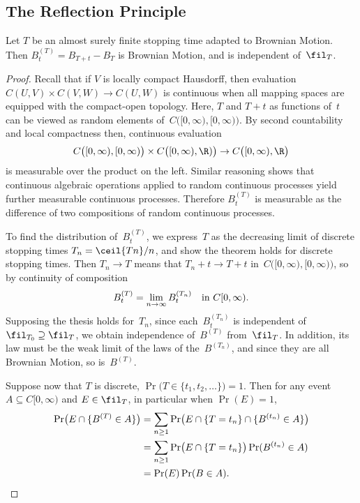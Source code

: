 \subsection	{The Reflection Principle}

\begin	{theorem}
Let $T$ be an almost surely finite stopping time adapted to Brownian Motion.
Then \( B^{(T)}_t = B_{T+t} - B_T \) is Brownian Motion,
and is independent of~$\fil_T$.
\end	{theorem}
\begin	{proof}
Recall that if $V$ is locally compact Hausdorff,
then evaluation \( C(U,V) \times C(V,W) \to C(U,W) \) is continuous
when all mapping spaces are equipped with the compact-open topology.
Here, $T$ and \( T + t \) as functions of~$t$
can be viewed as random elements of~$C\bigl([0,\infty),[0,\infty)\bigr)$.
By second countability and local compactness then,
continuous evaluation \[
	C\bigl([0,\infty),[0,\infty)\bigr) \times
		C\bigl([0,\infty),\R)\bigr)
	\to C\bigl([0,\infty),\R\bigr)
\] is measurable over the product on the left.
Similar reasoning shows that continuous algebraic operations
applied to random continuous processes
yield further measurable continuous processes.
Therefore $B^{(T)}_t$ is measurable as the difference
of two compositions of random continuous processes.

To find the distribution of~$B^{(T)}_t$,
we express~$T$ as the decreasing limit of discrete stopping times
\( T_n = \ceil{Tn}/n \),
and show the theorem holds for discrete stopping times.
Then \( T_n \to T \) means that \( T_n + t \to T + t \)
in~$C\bigl([0,\infty),[0,\infty)\bigr)$,
so by continuity of composition \[
	B^{(T)}_t = \lim_{n\to\infty} B^{(T_n)}_t
	\quad \text{in~\( C[0,\infty) \).}
\]
Supposing the thesis holds for~$T_n$,
since each~$B^{(T_n)}_t$ is independent of~\( \fil_{T_0} \supseteq \fil_T \),
we obtain independence of~$B^{(T)}$ from~$\fil_T$.
In addition, its law must be the weak limit of the laws of the~$B^{(T_n)}$,
and since they are all Brownian Motion, so is~$B^{(T)}$.

Suppose now that $T$ is discrete,
\( \Pr\bigl(T\in\{t_1,t_2,\dotsc\}\bigr) = 1 \).
Then for any event \( A \subseteq C[0,\infty) \) and \( E \in \fil_T \),
in particular when \( \Pr(E) = 1 \),
\begin	{align*}
	\Pr\bigl(E\cap\{B^{(T)}\in A\}\bigr)
	&=	\sum_{n\ge1} \Pr\bigl(
			E \cap \{T=t_n\} \cap \{B^{(t_n)}\in A\}
		\bigr) \\
	&=	\sum_{n\ge1} \Pr\bigl( E \cap \{T=t_n\} \bigr)
			\Pr(B^{(t_n)}\in A) \\
	&=	\Pr(E) \Pr( B \in A )
	\text.
	\qedhere
\end	{align*}
\end	{proof}

